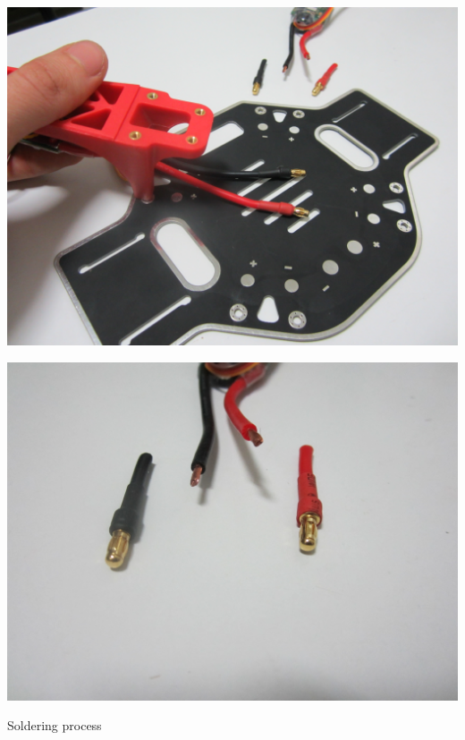 \documentclass[12pt, a4paper,twoside]{tesi_upf}
\begin{document}
\begin{minipage}{0.5\textwidth}
  \centering
  \includegraphics[width=0.8\linewidth]{Images/Mounting/IMG_0366.jpg}
  \label{fig:app1}
\end{minipage}%
\begin{minipage}{0.5\textwidth}
  \centering
  \includegraphics[width=0.8\linewidth]{Images/Mounting/IMG_0368.jpg}
  \label{fig:app2}
\end{minipage}


Soldering process
\\[12 pt]
\end{document}
